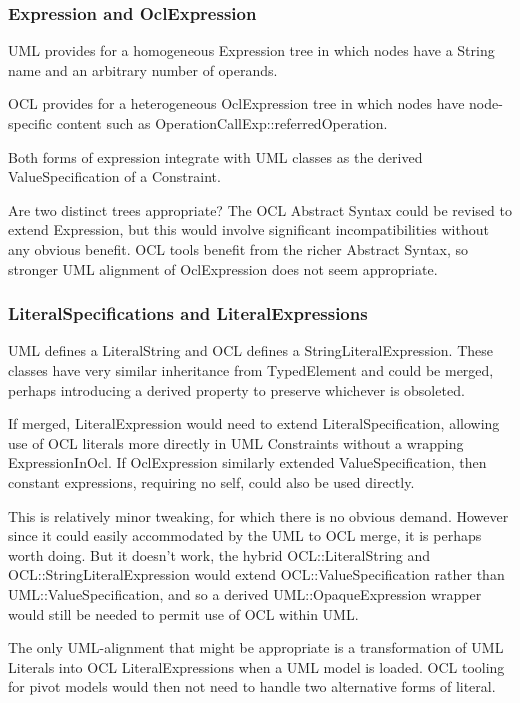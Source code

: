 \documentclass{eceasst}
\begin{document}
\subsubsection{Expression and OclExpression}

UML provides for a homogeneous Expression tree in which nodes have a String name and an arbitrary number of operands.

OCL provides for a heterogeneous OclExpression tree in which nodes have node-specific content such as OperationCallExp::referredOperation.

Both forms of expression integrate with UML classes as the derived ValueSpecification of a Constraint.

Are two distinct trees appropriate? The OCL Abstract Syntax could be revised to extend Expression, but this would involve significant incompatibilities without any obvious benefit. OCL tools benefit from the richer Abstract Syntax, so stronger UML alignment of OclExpression does not seem appropriate.

\subsubsection{LiteralSpecifications and LiteralExpressions}

UML defines a LiteralString and OCL defines a StringLiteralExpression. These classes have very similar inheritance from TypedElement and could be merged, perhaps introducing a derived property to preserve whichever is obsoleted.

If merged, LiteralExpression would need to extend LiteralSpecification, allowing use of OCL literals more directly in UML Constraints without a wrapping ExpressionInOcl. If OclExpression similarly extended ValueSpecification, then constant expressions, requiring no self, could also be used directly.

This is relatively minor tweaking, for which there is no obvious demand. However since it could easily accommodated by the UML to OCL merge, it is perhaps worth doing. But it doesn't work, the hybrid OCL::LiteralString and OCL::StringLiteralExpression would extend OCL::ValueSpecification rather than UML::ValueSpecification, and so a derived UML::Opaque\-Expression wrapper would still be needed to permit use of OCL within UML. 

The only UML-alignment that might be appropriate is a transformation of UML Literals into OCL LiteralExpressions when a UML model is loaded. OCL tooling for pivot models would then not need to handle two alternative forms of literal. 
\end{document}
